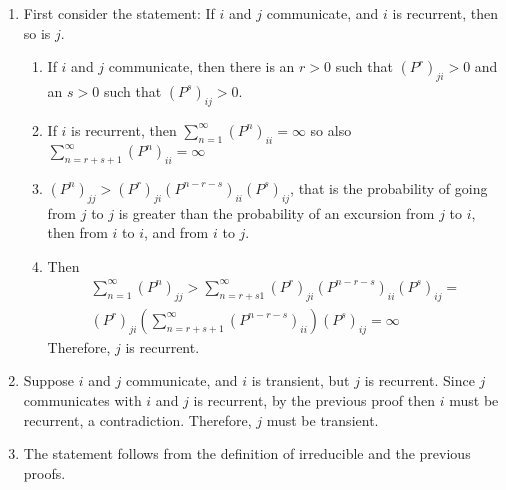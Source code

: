 \documentclass[12pt]{article}
\begin{document}
\begin{solution}
    \begin{enumerate}
        \item
            First consider the statement:  If \( i \) and \( j \)
            communicate, and \( i \) is recurrent, then so is \( j \).
            \begin{enumerate}
                \item
                    If \( i \) and \( j \) communicate, then there is an
                    \( r > 0 \) such that \( (P^r)_{ji} > 0 \) and an \(
                    s > 0 \) such that \( (P^s)_{ij} > 0 \).
                \item
                    If \( i \) is recurrent, then \( \sum_{n=1}^{\infty}
                    (P^n)_{ii} = \infty \) so also \( \sum_{n=r + s + 1}^
                    {\infty} (P^n)_{ii} = \infty \)
                \item
                    \( ( P^n)_{jj} > (P^r)_{ji}(P^{n-r-s})_{ii}(P^s)_{ij}
                    \), that is the probability of going from \( j \) to
                    \( j \) is greater than the probability of an
                    excursion from \( j \) to \( i \), then from \( i \)
                    to \( i \), and from \( i \) to \( j \).
                \item
                    Then
                    \begin{multline*}
                        \sum_{n=1}^{\infty}(P^n)_{jj} > \sum_{n=r+s1}^{\infty}
                        (P^r)_{ji}(P^{n-r-s})_{ii}(P^s)_{ij} = \\
                        (P^r)_{ji}\left(\sum_{n=r+s+1}^{\infty}(P^{n-r-s})_
                        {ii}\right)(P^s)_{ij} = \infty
                    \end{multline*}
                    Therefore, \( j \) is recurrent.
            \end{enumerate}
        \item
            Suppose \( i \) and \( j \) communicate, and \( i \) is
            transient, but \( j \) is recurrent.  Since \( j \)
            communicates with \( i \) and \( j \) is recurrent, by the
            previous proof then \( i \) must be recurrent, a
            contradiction.  Therefore, \( j \) must be transient.
        \item
            The statement follows from the definition of irreducible and
            the previous proofs.
    \end{enumerate}
\end{solution}
\end{document}
